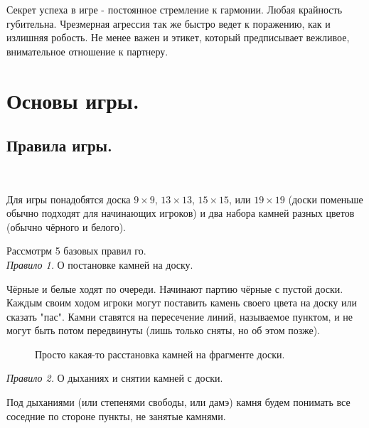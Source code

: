 \documentclass[14pt,a4paper]{extarticle}
\begin{document}
Секрет успеха в игре - постоянное стремление к гармонии. Любая крайность губительна. Чрезмерная агрессия так же быстро ведет к поражению, как и излишняя робость. Не менее важен и этикет, который предписывает вежливое, внимательное отношение к партнеру.

\newpage

\section*{Основы игры.}

\subsection*{Правила игры.}
\

Для игры понадобятся доска $9\times9$, $13\times13$, $15\times15$, или $19\times19$ (доски поменьше обычно подходят для начинающих игроков) и два набора камней разных цветов (обычно чёрного и белого).

Рассмотрм 5 базовых правил го.
\\


\textit{Правило 1.} О постановке камней на доску.

Чёрные и белые ходят по очереди. Начинают партию чёрные с пустой доски. Каждым своим ходом игроки могут поставить камень своего цвета на доску или сказать "пас". Камни ставятся на пересечение линий, называемое пунктом, и не могут быть потом передвинуты (лишь только сняты, но об этом позже).

\begin{figure}[h]
\centering
{}
\caption{Просто какая-то расстановка камней на фрагменте доски.} \label{1}
\end{figure}

\textit{Правило 2.} О дыханиях и снятии камней с доски.

Под дыханиями (или степенями свободы, или дамэ) камня будем понимать все соседние по стороне пункты, не занятые камнями.
\end{document}
